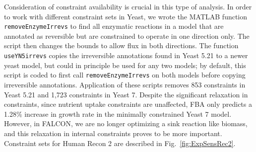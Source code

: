 Consideration of constraint availability is crucial in this type of
analysis. In order to work with different constraint sets in Yeast, we
wrote the MATLAB function \texttt{removeEnzymeIrrevs} to find all
enzymatic reactions in a model that are annotated as reversible but
are constrained to operate in one direction only. The script then
changes the bounds to allow flux in both directions. The function
\texttt{useYN5irrevs} copies the irreversible annotations found in
Yeast 5.21 \citep{Lee2012} to a newer yeast model, but could in
principle be used for any two models; by default, this script is coded
to first call \texttt{removeEnzymeIrrevs} on both models before
copying irreversible annotations. Application of these scripts removes
853 constraints in Yeast 5.21 and 1,723 constraints in Yeast 7.
Despite the significant relaxation in constraints, since nutrient
uptake constraints are unaffected, FBA only predicts a 1.28\% increase
in growth rate in the minimally constrained Yeast 7 model. However, in
FALCON, we are no longer optimizing a sink reaction like biomass, and
this relaxation in internal constraints proves to be more important.
Constraint sets for Human Recon 2 are described in \suppOrApp 
Fig.~\ref{fig:ExpSensRec2}.

